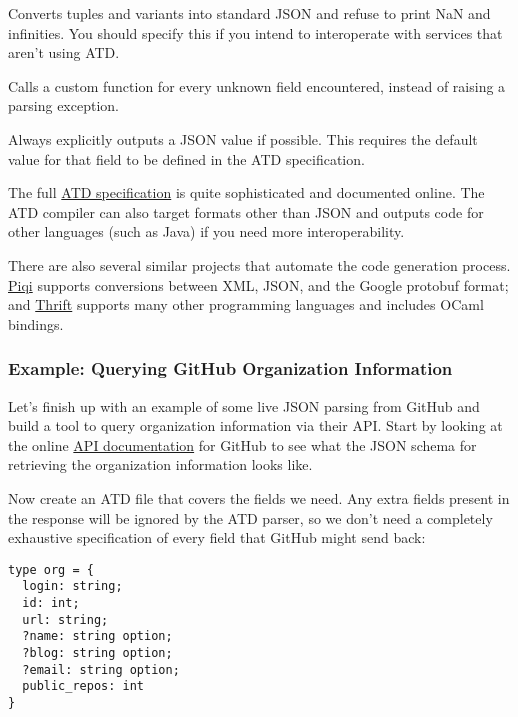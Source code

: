 \begin{description}
\tightlist
\item[\texttt{-j-std}]
Converts tuples and variants into standard JSON and refuse to print NaN
and infinities. You should specify this if you intend to interoperate
with services that aren't using ATD.
\item[\texttt{-j-custom-fields\ FUNCTION}]
Calls a custom function for every unknown field encountered, instead of
raising a parsing exception.
\item[\texttt{-j-defaults}]
Always explicitly outputs a JSON value if possible. This requires the
default value for that field to be defined in the ATD specification.
\end{description}

The full \href{https://atd.readthedocs.io/en/latest/}{ATD specification}
is quite sophisticated and documented online. The ATD compiler can also
target formats other than JSON and outputs code for other languages
(such as Java) if you need more interoperability.

There are also several similar projects that automate the code
generation process. \href{http://piqi.org}{Piqi} supports conversions
between XML, JSON, and the Google protobuf format; and
\href{http://thrift.apache.org}{Thrift} supports many other programming
languages and includes OCaml bindings.

\hypertarget{example-querying-github-organization-information}{%
\subsubsection{Example: Querying GitHub Organization
Information}\label{example-querying-github-organization-information}}

Let's finish up with an example of some live JSON parsing from GitHub
and build a tool to query organization information via their API. Start
by looking at the online \href{http://developer.github.com/v3/orgs/}{API
documentation} for GitHub to see what the JSON schema for retrieving the
organization information looks like.

Now create an ATD file that covers the fields we need. Any extra fields
present in the response will be ignored by the ATD parser, so we don't
need a completely exhaustive specification of every field that GitHub
might send back:

\begin{lstlisting}
type org = {
  login: string;
  id: int;
  url: string;
  ?name: string option;
  ?blog: string option;
  ?email: string option;
  public_repos: int
}
\end{lstlisting}

